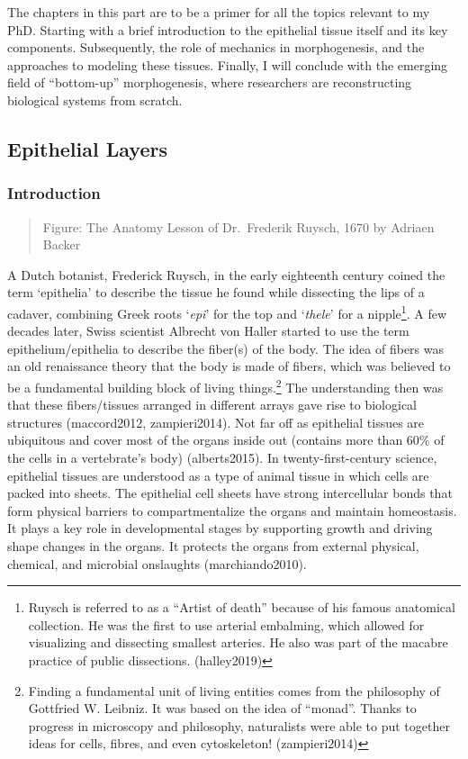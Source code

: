 \documentclass[
]{article}
\begin{document}
The chapters in this part are to be a primer for all the topics relevant
to my PhD. Starting with a brief introduction to the epithelial tissue
itself and its key components. Subsequently, the role of mechanics in
morphogenesis, and the approaches to modeling these tissues. Finally, I
will conclude with the emerging field of ``bottom-up'' morphogenesis,
where researchers are reconstructing biological systems from scratch.

\hypertarget{epithelial-layers-1}{%
\subsection{Epithelial Layers}\label{epithelial-layers-1}}

\hypertarget{introduction}{%
\subsubsection{Introduction}\label{introduction}}

\begin{quote}
Figure: The Anatomy Lesson of Dr.~Frederik Ruysch, 1670 by Adriaen
Backer
\end{quote}

A Dutch botanist, Frederick Ruysch, in the early eighteenth century
coined the term `epithelia' to describe the tissue he found while
dissecting the lips of a cadaver, combining Greek roots `\emph{epi}' for
the top and `\emph{thele}' for a nipple\footnote{Ruysch is referred to
  as a ``Artist of death'' because of his famous anatomical collection.
  He was the first to use arterial embalming, which allowed for
  visualizing and dissecting smallest arteries. He also was part of the
  macabre practice of public dissections. (halley2019)}. A few decades
later, Swiss scientist Albrecht von Haller started to use the term
epithelium/epithelia to describe the fiber(s) of the body. The idea of
fibers was an old renaissance theory that the body is made of fibers,
which was believed to be a fundamental building block of living
things.\footnote{Finding a fundamental unit of living entities comes
  from the philosophy of Gottfried W. Leibniz. It was based on the idea
  of ``monad''. Thanks to progress in microscopy and philosophy,
  naturalists were able to put together ideas for cells, fibres, and
  even cytoskeleton! (zampieri2014)} The understanding then was that
these fibers/tissues arranged in different arrays gave rise to
biological structures (maccord2012, zampieri2014). Not far off as
epithelial tissues are ubiquitous and cover most of the organs inside
out (contains more than 60\% of the cells in a vertebrate's body)
(alberts2015). In twenty-first-century science, epithelial tissues are
understood as a type of animal tissue in which cells are packed into
sheets. The epithelial cell sheets have strong intercellular bonds that
form physical barriers to compartmentalize the organs and maintain
homeostasis. It plays a key role in developmental stages by supporting
growth and driving shape changes in the organs. It protects the organs
from external physical, chemical, and microbial onslaughts
(marchiando2010).
\end{document}
